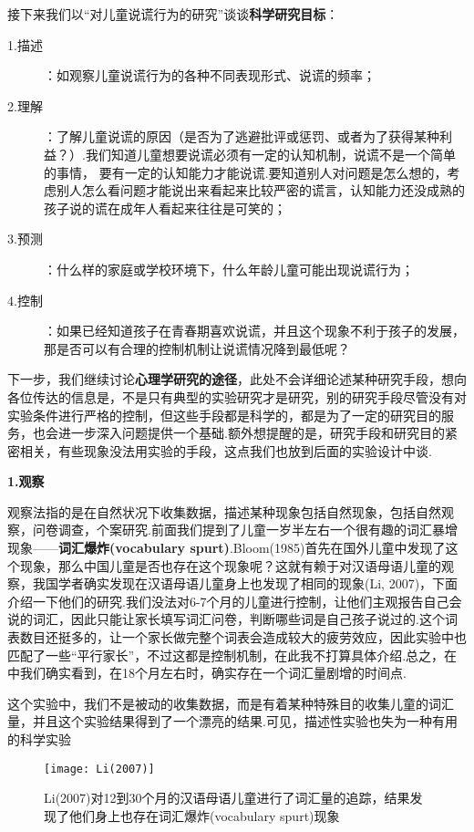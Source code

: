 接下来我们以“对儿童说谎行为的研究”谈谈\textbf{科学研究目标}：

\begin{description}
    \item[1.描述]：如观察儿童说谎行为的各种不同表现形式、说谎的频率；
    \item[2.理解]：了解儿童说谎的原因（是否为了逃避批评或惩罚、或者为了获得某种利益？）.我们知道儿童想要说谎必须有一定的认知机制，说谎不是一个简单的事情， 要有一定的认知能力才能说谎.要知道别人对问题是怎么想的，考虑别人怎么看问题才能说出来看起来比较严密的谎言，认知能力还没成熟的孩子说的谎在成年人看起来往往是可笑的；
    \item[3.预测]：什么样的家庭或学校环境下，什么年龄儿童可能出现说谎行为；
    \item[4.控制]：如果已经知道孩子在青春期喜欢说谎，并且这个现象不利于孩子的发展，那是否可以有合理的控制机制让说谎情况降到最低呢？
\end{description}


下一步，我们继续讨论\textbf{心理学研究的途径}，此处不会详细论述某种研究手段，想向各位传达的信息是，不是只有典型的实验研究才是研究，别的研究手段尽管没有对实验条件进行严格的控制，但这些手段都是科学的，都是为了一定的研究目的服务，也会进一步深入问题提供一个基础.额外想提醒的是，研究手段和研究目的紧密相关，有些现象没法用实验的手段，这点我们也放到后面的实验设计中谈.

\textbf{1.观察}

观察法指的是在自然状况下收集数据，描述某种现象包括自然现象，包括自然观察，问卷调查，个案研究.前面我们提到了儿童一岁半左右一个很有趣的词汇暴增现象——\textbf{词汇爆炸(vocabulary spurt)}.Bloom(1985)首先在国外儿童中发现了这个现象，那么中国儿童是否也存在这个现象呢？这就有赖于对汉语母语儿童的观察，我国学者确实发现在汉语母语儿童身上也发现了相同的现象(Li, 2007)，下面介绍一下他们的研究.我们没法对6-7个月的儿童进行控制，让他们主观报告自己会说的词汇，因此只能让家长填写词汇问卷，判断哪些词是自己孩子说过的.这个词表数目还挺多的，让一个家长做完整个词表会造成较大的疲劳效应，因此实验中也匹配了一些“平行家长”，不过这都是控制机制，在此我不打算具体介绍.总之，在中我们确实看到，在18个月左右时，确实存在一个词汇量剧增的时间点.

这个实验中，我们不是被动的收集数据，而是有着某种特殊目的收集儿童的词汇量，并且这个实验结果得到了一个漂亮的结果.可见，描述性实验也失为一种有用的科学实验

\begin{figure}
    \texttt{[image: Li(2007)]}
    \caption{Li(2007)对12到30个月的汉语母语儿童进行了词汇量的追踪，结果发现了他们身上也存在词汇爆炸(vocabulary spurt)现象}
\end{figure}


